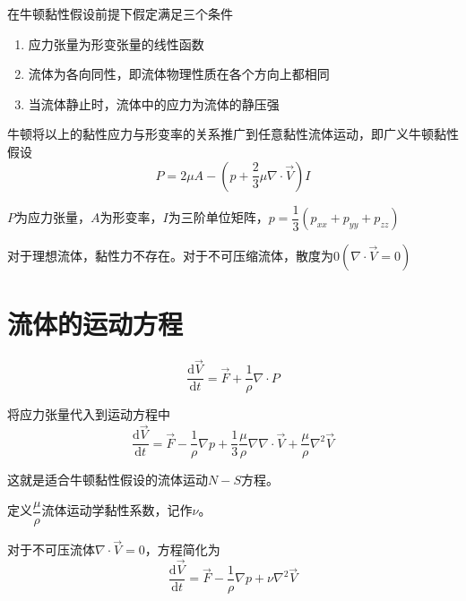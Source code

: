\documentclass[a4paper,oneside]{ctexbook}
\begin{document}
在牛顿黏性假设前提下假定满足三个条件
\begin{enumerate}
    \item 应力张量为形变张量的线性函数
    \item 流体为各向同性，即流体物理性质在各个方向上都相同
    \item 当流体静止时，流体中的应力为流体的静压强
\end{enumerate}

牛顿将以上的黏性应力与形变率的关系推广到任意黏性流体运动，即广义牛顿黏性假设
\begin{equation}
    P=2\mu{A}-\left(p+\dfrac{2}{3}\mu\nabla\cdot\overrightarrow{V}\right)I
\end{equation}

\(P\)为应力张量，\(A\)为形变率，\(I\)为三阶单位矩阵，\(p=\dfrac{1}{3}(p_{xx}+p_{yy}+p_{zz})\)

对于理想流体，黏性力不存在。对于不可压缩流体，散度为\(0(\nabla\cdot\overrightarrow{V}=0)\)

\section{流体的运动方程}
\begin{equation}
    \dfrac{\mathrm{d}\overrightarrow{V}}{\mathrm{d}t}=\overrightarrow{F}+\dfrac{1}{\rho}\nabla\cdot{P}
\end{equation}

将应力张量代入到运动方程中
\begin{equation}
    \dfrac{\mathrm{d}\overrightarrow{V}}{\mathrm{d}t}=\overrightarrow{F}-\dfrac{1}{\rho}\nabla{p}+\dfrac{1}{3}\dfrac{\mu}{\rho}\nabla\nabla\cdot\overrightarrow{V}+\dfrac{\mu}{\rho}\nabla^2\overrightarrow{V}
\end{equation}

这就是适合牛顿黏性假设的流体运动\(N-S\)方程。

定义\(\dfrac{\mu}{\rho}\)流体运动学黏性系数，记作\(\nu\)。

对于不可压流体\(\nabla\cdot\overrightarrow{V}=0\)，方程简化为
\begin{equation}
    \dfrac{\mathrm{d}\overrightarrow{V}}{\mathrm{d}t}=\overrightarrow{F}-\dfrac{1}{\rho}\nabla{p}+\nu\nabla^2\overrightarrow{V}
\end{equation}
\end{document}

